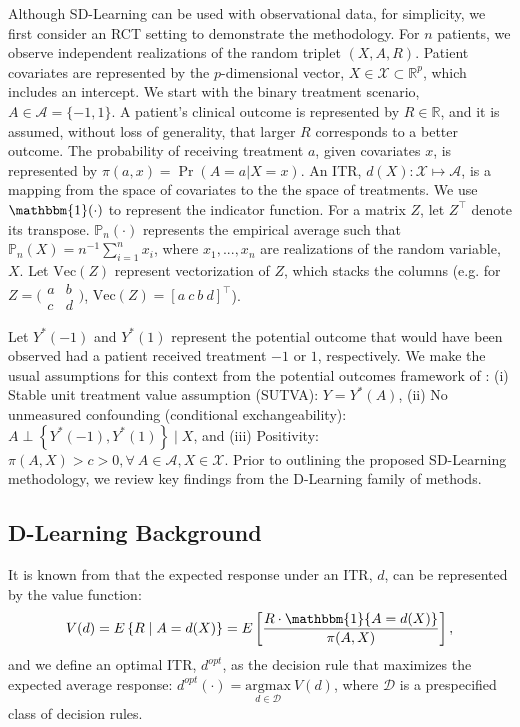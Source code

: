 \documentclass[useAMS,usenatbib]{biom}
\begin{document}
Although SD-Learning can be used with observational data, for simplicity, we first consider an RCT setting to demonstrate the methodology. For $n$ patients, we observe independent realizations of the random triplet $(X, A, R)$. Patient covariates are represented by the $p$-dimensional vector, $X \in \mathcal{X} \subset \mathbb{R}^{p}$, which includes an intercept. We start with the binary treatment scenario, $A \in \mathcal{A} = \{ -1, 1 \}$. A patient's clinical outcome is represented by $R \in \mathbb{R}$, and it is assumed, without loss of generality, that larger $R$ corresponds to a better outcome. The probability of receiving treatment $a$, given covariates $x$, is represented by $\pi(a, x) = \Pr(A=a|X=x)$. An ITR, $d(X) \colon \mathcal{X} \mapsto \mathcal{A}$, is a mapping from the space of covariates to the the space of treatments. We use $\mathbbm{1}(\cdot)$ to represent the indicator function. For a matrix $Z$, let $Z^{\top}$ denote its transpose. $\mathbb{P}_n \left( \cdot \right)$ represents the empirical average such that $\mathbb{P}_n(X) = n^{-1} \sum_{i=1}^{n} x_i$, where $x_1,...,x_n$ are realizations of the random variable, $X$. Let $\mbox{Vec}(Z)$ represent vectorization of $Z$, which stacks the columns (e.g. for $Z = \big(\begin{smallmatrix}
a & b \\ c & d \end{smallmatrix}\big)$, $\mbox{Vec}(Z) = [a\ c\ b\ d]^{\top}$).

Let $Y^*(-1)$ and $Y^*(1)$ represent the potential outcome that would have been observed had a patient received treatment $-1$ or $1$, respectively. We make the usual assumptions for this context from the potential outcomes framework of \cite{rubin_estimating_1974}: (i) Stable unit treatment value assumption (SUTVA): $Y = Y^*(A)$, (ii) No unmeasured confounding (conditional exchangeability): $A \perp \left\{ Y^*(-1), Y^*(1) \right\} \mid X$, and (iii) Positivity: $\pi(A,X) > c > 0, \forall\ A \in \mathcal{A}, X \in \mathcal{X}$. Prior to outlining the proposed SD-Learning methodology, we review key findings from the D-Learning family of methods.

\subsection{D-Learning Background} \label{subsec_dlearn}

It is known from \cite{qian_performance_2011} that the expected response under an ITR, $d$, can be represented by the value function:
\begin{equation*}
V(d) = E\left\{ R \mid A=d(X) \right\} = E \left[ \frac{R \cdot \mathbbm{1}\{A=d(X)\}}{\pi(A,X)} \right],
\end{equation*}
and we define an optimal ITR, $d^{opt}$, as the decision rule that maximizes the expected average response: $d^{opt}(\cdot) = \underset{d \in \mathcal{D}}{\mathrm{argmax}}\ V(d)$, where $\mathcal{D}$ is a prespecified class of decision rules. 
\end{document}
